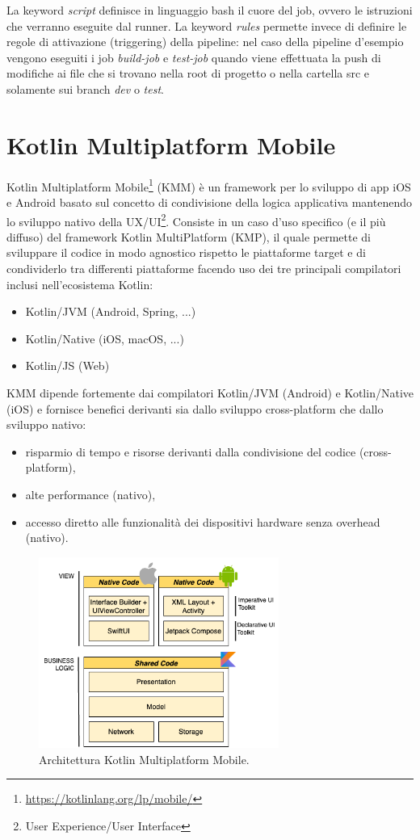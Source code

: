 La keyword \textit{script} definisce in linguaggio bash il cuore del job, ovvero le istruzioni che verranno eseguite dal runner. La keyword \textit{rules} permette invece di definire le regole di attivazione (triggering) della pipeline: nel caso della pipeline d'esempio vengono eseguiti i job \textit{build-job} e \textit{test-job} quando viene effettuata la push di modifiche ai file che si trovano nella root di progetto o nella cartella src e solamente sui branch \textit{dev} o \textit{test}.

\section{Kotlin Multiplatform Mobile}
Kotlin Multiplatform Mobile\footnote{\url{https://kotlinlang.org/lp/mobile/}} (KMM) è un framework per lo sviluppo di app iOS e Android basato sul concetto di condivisione della logica applicativa mantenendo lo sviluppo nativo della UX/UI\footnote{User Experience/User Interface}. Consiste in un caso d'uso specifico (e il più diffuso) del framework Kotlin MultiPlatform (KMP), il quale permette di sviluppare il codice in modo agnostico rispetto le piattaforme target e di condividerlo tra differenti piattaforme facendo uso dei tre principali compilatori inclusi nell'ecosistema Kotlin\cite{nagy2022simplifying}:
\begin{itemize}
    \item Kotlin/JVM (Android, Spring, ...)
    \item Kotlin/Native (iOS, macOS, ...)
    \item Kotlin/JS (Web)
\end{itemize}
KMM dipende fortemente dai compilatori Kotlin/JVM (Android) e Kotlin/Native (iOS) e fornisce benefici derivanti sia dallo sviluppo cross-platform che dallo sviluppo nativo:
\begin{itemize}
    \item risparmio di tempo e risorse derivanti dalla condivisione del codice (cross-platform),
    \item alte performance (nativo),
    \item accesso diretto alle funzionalità dei dispositivi hardware senza overhead (nativo).
\end{itemize}

\begin{figure}[H]
\centering
\includegraphics[width=0.7\textwidth]{img/tesi-8-kmm.drawio.png}
\caption{Architettura Kotlin Multiplatform Mobile.}
\label{stackKMM}
\end{figure}


